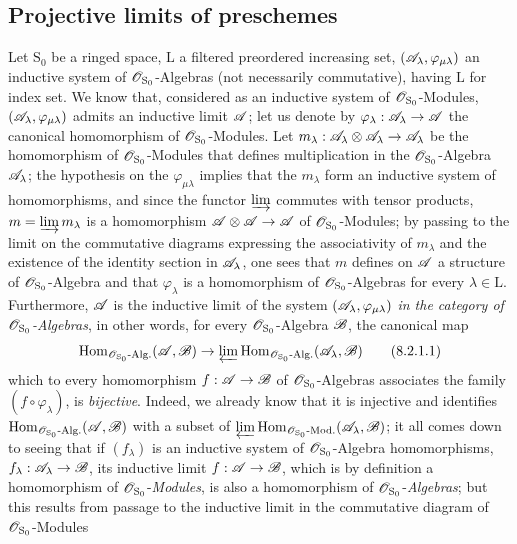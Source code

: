 \subsection{Projective limits of preschemes}
\label{subsection:IV.8.2}

\begin{env}[8.2.1]
\label{IV.8.2.1}
Let $\mathrm{S}_0$ be a ringed space, $\mathrm{L}$ a filtered preordered increasing set, $(\mathscr{A}_\lambda,\varphi_{\mu\lambda})$ an inductive system of $\mathscr{O}_{\mathrm{S}_0}$-Algebras (not necessarily commutative), having $\mathrm{L}$ for index set.
We know that, considered as an inductive system of $\mathscr{O}_{\mathrm{S}_0}$-Modules, $(\mathscr{A}_\lambda,\varphi_{\mu\lambda})$ admits an inductive limit $\mathscr{A}$; let us denote by $\varphi_\lambda:\mathscr{A}_\lambda\to\mathscr{A}$ the canonical homomorphism of $\mathscr{O}_{\mathrm{S}_0}$-Modules.
Let $m_\lambda:\mathscr{A}_\lambda\otimes\mathscr{A}_\lambda\to\mathscr{A}_\lambda$ be the homomorphism of $\mathscr{O}_{\mathrm{S}_0}$-Modules that defines multiplication in the $\mathscr{O}_{\mathrm{S}_0}$-Algebra $\mathscr{A}_\lambda$; the hypothesis on the $\varphi_{\mu\lambda}$ implies that the $m_\lambda$ form an inductive system of homomorphisms,
and since the functor $\varinjlim$ commutes with tensor products, $m=\varinjlim m_\lambda$ is a homomorphism $\mathscr{A}\otimes\mathscr{A}\to\mathscr{A}$ of $\mathscr{O}_{\mathrm{S}_0}$-Modules; by passing to the limit on the commutative diagrams expressing the associativity of $m_\lambda$ and the existence of the identity section in $\mathscr{A}_\lambda$, one sees that $m$ defines on $\mathscr{A}$ a structure of $\mathscr{O}_{\mathrm{S}_0}$-Algebra and that $\varphi_\lambda$ is a homomorphism of $\mathscr{O}_{\mathrm{S}_0}$-Algebras for every $\lambda\in\mathrm{L}$.
Furthermore, $\mathscr{A}$ is the inductive limit of the system $(\mathscr{A}_\lambda,\varphi_{\mu\lambda})$ \emph{in the category of $\mathscr{O}_{\mathrm{S}_0}$-Algebras}, in other words, for every $\mathscr{O}_{\mathrm{S}_0}$-Algebra $\mathscr{B}$, the canonical map
\begin{equation}
  \operatorname{Hom}_{\mathscr{O}_{\mathrm{S}_0}\text{-}\mathrm{Alg.}}(\mathscr{A},\mathscr{B})\to\varprojlim\operatorname{Hom}_{\mathscr{O}_{\mathrm{S}_0}\text{-}\mathrm{Alg.}}(\mathscr{A}_\lambda,\mathscr{B})
  \tag{8.2.1.1}
\label{IV.8.2.1.1}
\end{equation}
which to every homomorphism $f:\mathscr{A}\to\mathscr{B}$ of $\mathscr{O}_{\mathrm{S}_0}$-Algebras associates the family $(f\circ\varphi_\lambda)$, is \emph{bijective}.
Indeed, we already know that it is injective and identifies $\operatorname{Hom}_{\mathscr{O}_{\mathrm{S}_0}\text{-}\mathrm{Alg.}}(\mathscr{A},\mathscr{B})$ with a subset of $\varprojlim\operatorname{Hom}_{\mathscr{O}_{\mathrm{S}_0}\text{-}\mathrm{Mod.}}(\mathscr{A}_\lambda,\mathscr{B})$; it all comes down to seeing that if $(f_\lambda)$ is an inductive system of $\mathscr{O}_{\mathrm{S}_0}$-Algebra homomorphisms, $f_\lambda:\mathscr{A}_\lambda\to\mathscr{B}$, its inductive limit $f:\mathscr{A}\to\mathscr{B}$, which is by definition a homomorphism of $\mathscr{O}_{\mathrm{S}_0}$-\emph{Modules}, is also a homomorphism of $\mathscr{O}_{\mathrm{S}_0}$-\emph{Algebras}; but this results from passage to the inductive limit in the commutative diagram of $\mathscr{O}_{\mathrm{S}_0}$-Modules

\end{env}
